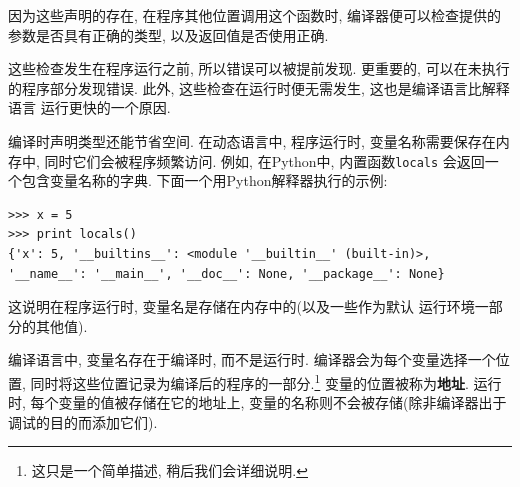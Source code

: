 \documentclass[12pt]{book}
\begin{document}
{%
因为这些声明的存在, 在程序其他位置调用这个函数时, 
编译器便可以检查提供的参数是否具有正确的类型, 
以及返回值是否使用正确.

这些检查发生在程序运行之前, 
所以错误可以被提前发现.
更重要的, 可以在未执行的程序部分发现错误.
此外, 这些检查在运行时便无需发生, 这也是编译语言比解释语言
运行更快的一个原因.

编译时声明类型还能节省空间.
在动态语言中, 程序运行时, 变量名称需要保存在内存中,
同时它们会被程序频繁访问.
例如, 在Python中, 内置函数{\tt locals} 会返回一个包含变量名称的字典.
下面一个用Python解释器执行的示例:

\begin{verbatim}
>>> x = 5
>>> print locals()
{'x': 5, '__builtins__': <module '__builtin__' (built-in)>,
'__name__': '__main__', '__doc__': None, '__package__': None}
\end{verbatim}
这说明在程序运行时, 变量名是存储在内存中的(以及一些作为默认
运行环境一部分的其他值).

编译语言中, 变量名存在于编译时, 而不是运行时.
编译器会为每个变量选择一个位置,
同时将这些位置记录为编译后的程序的一部分.\footnote{
这只是一个简单描述, 稍后我们会详细说明.}  
变量的位置被称为{\bf 地址}.
运行时, 每个变量的值被存储在它的地址上,
变量的名称则不会被存储(除非编译器出于调试的目的而添加它们).

}
\end{document}
